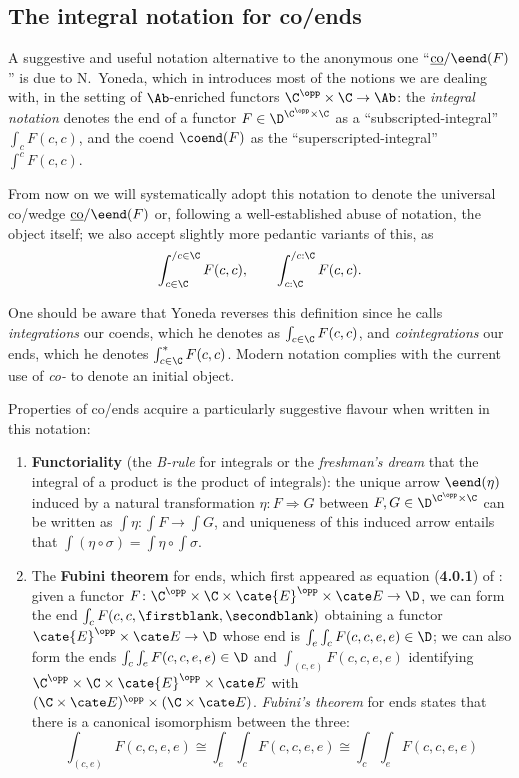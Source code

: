 \subsection{The integral notation for co/ends}
A suggestive and useful notation alternative to the anonymous one ``$\underline{\text{co}}/\eend(F)$'' is due to N\@.~Yoneda, which in \cite{yoneda} introduces most of the notions we are dealing with, in the setting of $\Ab$\hyp{}enriched functors $\C^\opp\times \C\to \Ab$: the \emph{integral notation} denotes the end of a functor $F\in \D^{\C^\opp\times \C}$ as a ``subscripted\hyp{}integral'' $\int_cF(c,c)$, and the coend $\coend(F)$ as the ``superscripted\hyp{}integral'' $\int^cF(c,c)$.

From now on we will systematically adopt this notation to denote the universal co/wedge $\underline{\text{co}}/\eend(F)$ or, following a well\hyp{}established abuse of notation, the object itself; we also accept slightly more pedantic variants of this, as
\[
\int_{c\in \C}^{/c\in \C}F(c,c), \qquad \int_{c:\C}^{/c:\C}F(c,c).
\]
\begin{remark}
One should be aware that Yoneda reverses this definition since he calls \emph{integrations} our coends, which he denotes as $\int_{c\in\C} F(c,c)$, and \emph{cointegrations} our ends, which he denotes $\int_{c\in\C}^*F(c,c)$. Modern notation complies with the current use of \emph{co-} to denote an initial object.
\end{remark}
\begin{remark}
Properties of co/ends acquire a particularly suggestive flavour when written in this notation:
\begin{enumerate}[label=\oldstylenums{\arabic*})]
\item \textbf{Functoriality} (the \emph{B-rule} for integrals or the \emph{freshman's dream} that the integral of a product is the product of integrals): the unique arrow $\eend(\eta)$ induced by a natural transformation $\eta\colon F\Rightarrow G$ between $F,G\in\D^{ \C^\opp \times \C }$ can be written as $\int\eta\colon \int F\to \int G$, and uniqueness of this induced arrow entails that $\int (\eta\circ\sigma)=\int \eta\circ\int \sigma$.
\item The \textbf{Fubini theorem} for ends, which first appeared as equation (\textbf{4.0.1}) of \cite{yoneda}: given a functor $F\colon \C^\opp\times\C\times \cate{E}^\opp\times \cate E\to \D$, we can form the end $\int_cF(c,c,\firstblank,\secondblank)$ obtaining a functor $\cate{E}^\opp\times \cate E\to \D$ whose end is $\int_e\int_cF(c,c,e,e)\in \D$; we can also form the ends $\int_c\int_e F(c,c,e,e)\in \D$ and $\int_{(c,e)}F(c,c,e,e)$ identifying $\C^\opp\times\C\times \cate{E}^\opp\times \cate E$ with $(\C\times\cate E)^\opp\times (\C\times\cate E)$. \emph{Fubini's theorem} for ends states that there is a canonical isomorphism between the three:
\[
\int_{(c,e)}F(c,c,e,e)\cong 
\int_e\int_cF(c,c,e,e)\cong 
\int_c\int_e F(c,c,e,e)
\]
\end{enumerate}
\end{remark}
